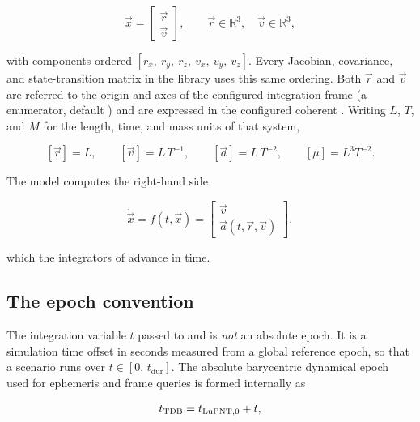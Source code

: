 \begin{equation}
  \label{eq:dyn-state}
  \vec{x} =
  \begin{bmatrix} \vec{r} \\ \vec{v} \end{bmatrix},
  \qquad \vec{r}\in\mathbb{R}^3,\quad \vec{v}\in\mathbb{R}^3,
\end{equation}

with components ordered $[r_x,\ r_y,\ r_z,\ v_x,\ v_y,\ v_z]$. Every Jacobian,
covariance, and state-transition matrix in the library uses this same ordering.
Both $\vec{r}$ and $\vec{v}$ are referred to the origin and axes of the
configured integration frame  (a  enumerator, default
) and are expressed in the configured coherent 
. Writing $L$, $T$, and $M$ for the length, time, and mass units of
that system,

\begin{equation}
  \label{eq:dyn-dims}
  [\vec{r}] = L, \qquad [\vec{v}] = L\,T^{-1}, \qquad [\vec{a}] = L\,T^{-2},
  \qquad [\mu] = L^{3}T^{-2}.
\end{equation}

The model computes the right-hand side

\begin{equation}
  \label{eq:dyn-rates}
  \dot{\vec{x}} = f(t,\vec{x}) =
  \begin{bmatrix} \vec{v} \\ \vec{a}(t,\vec{r},\vec{v}) \end{bmatrix},
\end{equation}

which the integrators of  advance in time.

\subsection{The epoch convention}

The integration variable $t$ passed to  and  is
\emph{not} an absolute epoch. It is a simulation time offset in seconds measured
from a global reference epoch, so that a scenario runs over $t\in[0,\,
t_\mathrm{dur}]$. The absolute barycentric dynamical epoch used for ephemeris and
frame queries is formed internally as

\begin{equation}
  \label{eq:dyn-epoch}
  t_{\mathrm{TDB}} = t_{\mathrm{LuPNT},0} + t,
\end{equation}

